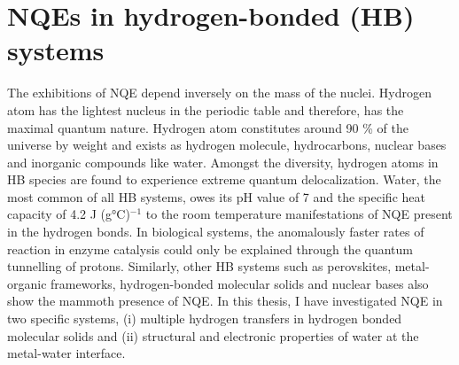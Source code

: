 
\section{NQEs in hydrogen-bonded (HB) systems}
\noindent The exhibitions of NQE depend inversely on the mass of the nuclei. Hydrogen atom has the lightest nucleus in the periodic table and therefore, has the maximal quantum nature. Hydrogen atom constitutes around 90 \% of the universe by weight and exists as hydrogen molecule, hydrocarbons, nuclear bases and inorganic compounds like water. Amongst the diversity, hydrogen atoms in HB species are found to experience extreme quantum delocalization\cite{markland2018nuclear,ceriotti2016nuclear}.  Water, the most common of all HB systems, owes its pH value of 7 \cite{ceriotti2016nuclear} and the specific heat capacity of 4.2 J (g°C)$^{-1}$ \cite{vega2010heat} to the room temperature manifestations of NQE present in the hydrogen bonds. In biological systems, the anomalously faster rates of reaction in enzyme catalysis could only be explained through the quantum tunnelling of protons\cite{sutcliffe2000enzymology,riaz2013review}. Similarly, other HB systems such as perovskites\cite{pena2001chemical,feng2018proton,chen2017kinetic}, metal-organic frameworks\cite{meng2017proton,teufel2013mfu}, hydrogen-bonded molecular solids\cite{wikfeldt2014communication,ivanov2015quantum} and nuclear bases\cite{kim2021quantum} also show the mammoth presence of NQE. In this thesis, I have investigated NQE in two specific systems, (i) multiple hydrogen transfers in hydrogen bonded molecular solids and (ii) structural and electronic properties of water at the metal-water interface.


